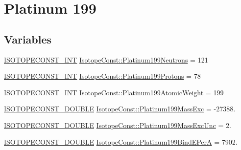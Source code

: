 \hypertarget{group___isotope_const-_platinum-_pt199}{}\section{Platinum 199}
\label{group___isotope_const-_platinum-_pt199}
\subsection*{Variables}
\begin{DoxyCompactItemize}
\item 
\mbox{\hyperlink{group___isotope_const-_macros_ga5f18360b3e99483a35c32d789e62621c}{I\+S\+O\+T\+O\+P\+E\+C\+O\+N\+S\+T\+\_\+\+I\+NT}} \mbox{\hyperlink{group___isotope_const-_platinum-_pt199_ga5b602ae048ecfbd82ec63bda8c08be93}{Isotope\+Const\+::\+Platinum199\+Neutrons}} = 121
\item 
\mbox{\hyperlink{group___isotope_const-_macros_ga5f18360b3e99483a35c32d789e62621c}{I\+S\+O\+T\+O\+P\+E\+C\+O\+N\+S\+T\+\_\+\+I\+NT}} \mbox{\hyperlink{group___isotope_const-_platinum-_pt199_gabb711b8d89472554626613e33688288d}{Isotope\+Const\+::\+Platinum199\+Protons}} = 78
\item 
\mbox{\hyperlink{group___isotope_const-_macros_ga5f18360b3e99483a35c32d789e62621c}{I\+S\+O\+T\+O\+P\+E\+C\+O\+N\+S\+T\+\_\+\+I\+NT}} \mbox{\hyperlink{group___isotope_const-_platinum-_pt199_ga568897ba106076285399ae5b50e9b2cf}{Isotope\+Const\+::\+Platinum199\+Atomic\+Weight}} = 199
\item 
\mbox{\hyperlink{group___isotope_const-_macros_ga8f45a7272ce02c0b4c65c44636ed719a}{I\+S\+O\+T\+O\+P\+E\+C\+O\+N\+S\+T\+\_\+\+D\+O\+U\+B\+LE}} \mbox{\hyperlink{group___isotope_const-_platinum-_pt199_ga26b3a73b2679df7d236051d0292ddc21}{Isotope\+Const\+::\+Platinum199\+Mass\+Exc}} = -\/27388.
\item 
\mbox{\hyperlink{group___isotope_const-_macros_ga8f45a7272ce02c0b4c65c44636ed719a}{I\+S\+O\+T\+O\+P\+E\+C\+O\+N\+S\+T\+\_\+\+D\+O\+U\+B\+LE}} \mbox{\hyperlink{group___isotope_const-_platinum-_pt199_ga1dd90217f2317737b7b9fd5eebaa87de}{Isotope\+Const\+::\+Platinum199\+Mass\+Exc\+Unc}} = 2.
\item 
\mbox{\hyperlink{group___isotope_const-_macros_ga8f45a7272ce02c0b4c65c44636ed719a}{I\+S\+O\+T\+O\+P\+E\+C\+O\+N\+S\+T\+\_\+\+D\+O\+U\+B\+LE}} \mbox{\hyperlink{group___isotope_const-_platinum-_pt199_ga351649824f258c47dd79bdf4bc26e79a}{Isotope\+Const\+::\+Platinum199\+Bind\+E\+PerA}} = 7902.
\item 

\end{DoxyCompactItemize}
